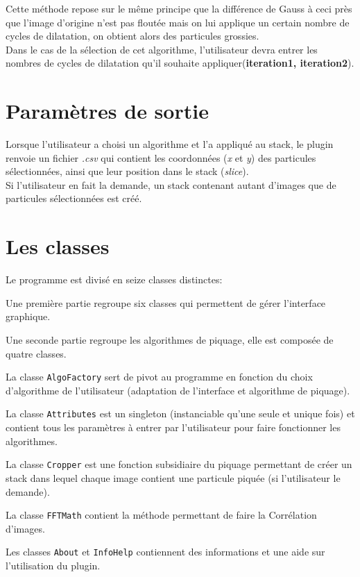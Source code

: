 \documentclass[12pt,a4paper]{report}
\begin{document}
Cette méthode repose sur le même principe que la différence de Gauss à ceci près que l'image d'origine n'est pas floutée mais on lui applique un certain nombre de cycles de dilatation, on obtient alors des particules grossies.\\
Dans le cas de la sélection de cet algorithme, l'utilisateur devra entrer les nombres de cycles de dilatation qu'il souhaite appliquer(\textbf{iteration1, iteration2}).

\section{Paramètres de sortie}

Lorsque l'utilisateur a choisi un algorithme et l'a appliqué au stack, le plugin renvoie un fichier \emph{.csv} qui contient les coordonnées (\emph{x} et \emph{y}) des particules sélectionnées, ainsi que leur position dans le stack (\emph{slice}).\\
Si l'utilisateur en fait la demande, un stack contenant autant d'images que de particules sélectionnées est créé.

\section{Les classes}

Le programme est divisé en seize classes distinctes:
\begin{list}{•}
\item Une première partie regroupe six classes qui permettent de gérer l'interface graphique.
\item
\item Une seconde partie regroupe les algorithmes de piquage, elle est composée de quatre classes.
\item La classe \texttt{AlgoFactory} sert de pivot au programme en fonction du choix d'algorithme de l'utilisateur (adaptation de l'interface et algorithme de piquage).
\item La classe \texttt{Attributes} est un singleton (instanciable qu'une seule et unique fois) et contient tous les paramètres à entrer par l'utilisateur pour faire fonctionner les algorithmes.
\item La classe \texttt{Cropper} est une fonction subsidiaire du piquage permettant de créer un stack dans lequel chaque image contient une particule piquée (si l'utilisateur le demande).
\item La classe \texttt{FFTMath} contient la méthode permettant de faire la Corrélation d'images.
\item Les classes \texttt{About} et \texttt{InfoHelp} contiennent des informations et une aide sur l'utilisation du plugin.
\end{list}
\end{document}
